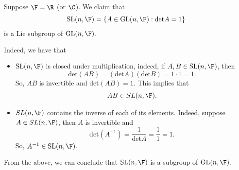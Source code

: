 \begin{eg}[\( SL(n,\F) \)]
    Suppose \( \F = \R  \) (or \( \C  \)). We claim that \[ \text{SL}(n,\F ) = \{ A \in \text{GL}(n, \F) : \text{det} A = 1   \}  \]  
    is a Lie subgroup of \( \text{GL}(n, \F) \).

    Indeed, we have that 
    \begin{itemize}
        \item \( \text{SL}(n, \F) \) is closed under multiplication, indeed, if \( A,B \in \text{SL}(n, \F) \), then
            \[ \text{det}(AB) = (\text{det} A ) (\text{det} B) = 1 \cdot 1  = 1.   \]
            So, \( AB  \) is invertible and \( \text{det}(AB) = 1  \). This implies that 
            \[  AB \in SL(n,\F). \]
        \item \( SL(n,\F) \) contains the inverse of each of its elements. Indeed, suppose \( A \in SL(n,\F) \), then \( A  \) is invertible and 
            \[  \text{det}(A^{-1}) = \frac{ 1 }{ \text{det}A }  = \frac{ 1 }{ 1 }  = 1. \]
            So, \( A^{-1} \in \text{SL}(n, \F) \).
    \end{itemize}
    From the above, we can conclude that \( \text{SL}(n, \F) \) is a subgroup of \( \text{GL}(n, \F)\).
\end{eg}
